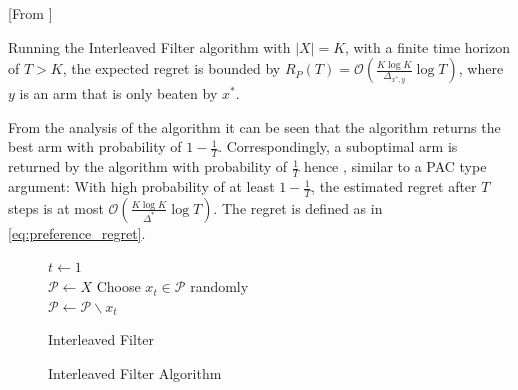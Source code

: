 \documentclass{llncs}
\begin{document}
	\begin{theorem}\label{thm:IF}[From \cite{...}]

		Running the Interleaved Filter algorithm with $|X|=K$, with a finite time horizon of $T>K$, the expected regret is bounded by $R_P(T) = \mathcal{O} \left( \frac{K\log K}{\Delta_{x^*,y}} \log T \right)$, where $y$ is an arm that is only beaten by $x^*$.

	\end{theorem}
	From the analysis of the algorithm it can be seen that the algorithm returns the best arm with probability of $1-\frac{1}{T}$.
	Correspondingly, a suboptimal arm is returned by the algorithm with probability of $\frac{1}{T}$ hence , similar to a PAC type argument: With high probability of at least $1-\frac{1}{T}$, the estimated regret after $T$ steps is at most $\mathcal{O} \left( \frac{K\log K}{\Delta^*} \log T \right)$. The regret is defined as in \eqref{eq:preference_regret}.
	
	\begin{figure}[h]
	\IncMargin{1em}
		\begin{algorithm}[H]
		
			$ t\leftarrow 1$\\
			$ \mathcal{P} \leftarrow X$
			Choose $x_t \in \mathcal{P}$ randomly\\
			$ \mathcal{P} \leftarrow \mathcal{P} \backslash x_t$\\
			\BlankLine
			\caption{Interleaved Filter}
		\end{algorithm}
		\caption{Interleaved Filter Algorithm}\label{algo_IF}
	\end{figure}
	
\end{document}
